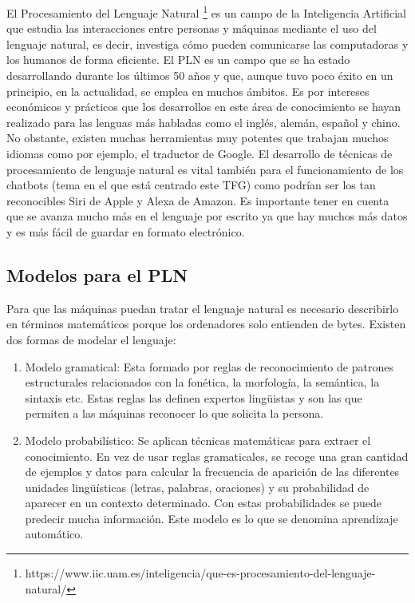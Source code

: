 El Procesamiento del Lenguaje Natural \footnote{https://www.iic.uam.es/inteligencia/que-es-procesamiento-del-lenguaje-natural/} es un campo de la Inteligencia Artificial que estudia las interacciones entre personas y máquinas mediante el uso del lenguaje natural, es decir, investiga cómo pueden comunicarse las computadoras y los humanos de forma eficiente. El PLN es un campo que se ha estado desarrollando durante los últimos 50 años y que, aunque tuvo poco éxito en un principio, en la actualidad, se emplea en muchos ámbitos. Es por intereses económicos y prácticos que los desarrollos en este área de conocimiento se hayan realizado para las lenguas más habladas como el inglés, alemán, español y chino. No obstante, existen muchas herramientas muy potentes que trabajan muchos idiomas como por ejemplo, el traductor de Google. El desarrollo de técnicas de procesamiento de lenguaje natural es vital también para el funcionamiento de los chatbots (tema en el que está centrado este TFG) como podrían ser los tan reconocibles Siri de Apple y Alexa de Amazon. Es importante tener en cuenta que se avanza mucho más en el lenguaje por escrito ya que hay muchos más datos y es más fácil de guardar en formato electrónico.


\subsection{Modelos para el PLN}

Para que las máquinas puedan tratar el lenguaje natural es necesario describirlo en términos matemáticos porque los ordenadores solo entienden de bytes. Existen dos formas de modelar el lenguaje:

\begin{enumerate}
	\item Modelo gramatical: Esta formado por reglas de reconocimiento de patrones estructurales relacionados con la fonética, la morfología, la semántica, la sintaxis etc. Estas reglas las definen expertos lingüistas y son las que permiten a las máquinas reconocer lo que solicita la persona.
	\item Modelo probabilístico: Se aplican técnicas matemáticas para extraer el conocimiento. En vez de usar reglas gramaticales, se recoge una gran cantidad de ejemplos y datos para calcular la frecuencia de aparición de las diferentes unidades lingüísticas (letras, palabras, oraciones) y su probabilidad de aparecer en un contexto determinado. Con estas probabilidades se puede predecir mucha información. Este modelo es lo que se denomina aprendizaje automático.
\end{enumerate}

